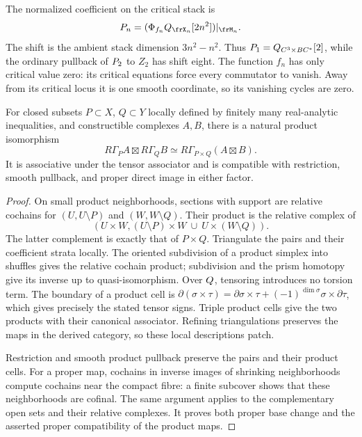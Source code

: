 The normalized coefficient on the critical stack is
\[
 \cP_n=(\Phi_{f_n}\Q_{\frX_n}[2n^2])|_{\frM_n}.
\]
The shift is the ambient stack dimension $3n^2-n^2$.
Thus $P_1=Q_{C^3\times BC^*}[2]$, while the ordinary pullback
of $P_2$ to $Z_2$ has shift eight.
The function $f_n$ has only critical value zero: its critical equations
force every commutator to vanish. Away from its critical locus it is
one smooth coordinate, so its vanishing cycles are zero.

\begin{lemma}
\label{ts22:lem:support-product}
For closed subsets $P\subset X$, $Q\subset Y$ locally defined by
finitely many real-analytic inequalities, and constructible complexes
$A,B$, there is a natural product isomorphism
\[
 R\Gamma_PA\boxtimes R\Gamma_QB
       \simeq R\Gamma_{P\times Q}(A\boxtimes B).
\]
It is associative under the tensor associator and is compatible with
restriction, smooth pullback, and proper direct image in either factor.
\end{lemma}

\begin{proof}
On small product neighborhoods, sections with support are relative
cochains for $(U,U\setminus P)$ and $(W,W\setminus Q)$. Their product
is the relative complex of
\[
 (U\times W,(U\setminus P)\times W\ \cup\ U\times(W\setminus Q)).
\]
The latter complement is exactly that of $P\times Q$.
Triangulate the pairs and their coefficient strata locally. The
oriented subdivision of a product simplex into shuffles gives the
relative cochain product; subdivision and the prism homotopy give
its inverse up to quasi-isomorphism. Over $Q$, tensoring introduces
no torsion term. The boundary of a product cell is
$\partial(\sigma\times\tau)=\partial\sigma\times\tau+
(-1)^{\dim\sigma}\sigma\times\partial\tau$, which gives precisely
the stated tensor signs. Triple product cells give the two products
with their canonical associator. Refining triangulations preserves
the maps in the derived category, so these local descriptions patch.

Restriction and smooth product pullback preserve the pairs and their
product cells. For a proper map, cochains in inverse images of
shrinking neighborhoods compute cochains near the compact fibre:
a finite subcover shows that these neighborhoods are cofinal.
The same argument applies to the complementary open sets and their
relative complexes. It proves both proper base change and the
asserted proper compatibility of the product maps.
\end{proof}

